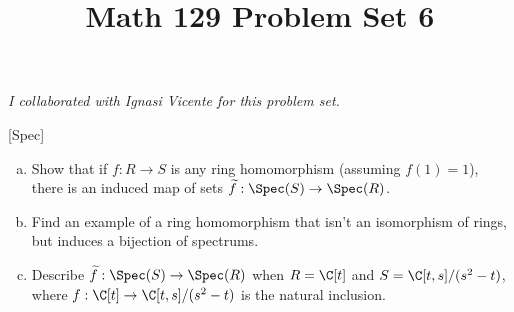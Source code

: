 \documentclass[11pt,letterpaper]{article}
\title{\textbf{Math 129 Problem Set 6}}
\begin{document}
\maketitle

\begin{center}
    \textit{I collaborated with Ignasi Vicente for this problem set.}
\end{center}

\begin{cproblem}{}[Spec]\noindent
    \begin{enumerate}[(a)]
        \item Show that if $f : R \to S$ is any ring homomorphism (assuming $f(1)=1$), there is an induced map of sets $\widetilde{f} : \Spec(S) \to \Spec(R)$.
        \item Find an example of a ring homomorphism that isn't an isomorphism of rings, but induces a bijection of spectrums.
        \item Describe $\widetilde{f} : \Spec(S) \to \Spec(R)$ when $R=\C[t]$ and $S=\C[t,s] /(s^2-t)$, where $f : \C[t] \to \C[t,s]/(s^2-t)$ is the natural inclusion. 
    \end{enumerate}
\end{cproblem}
\end{document}
